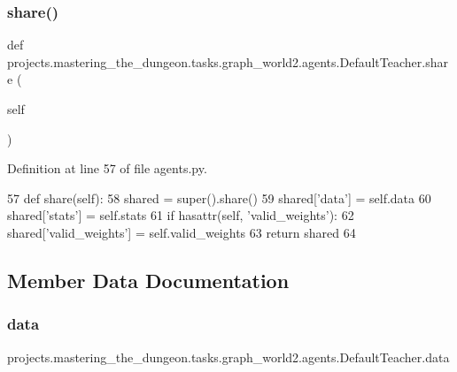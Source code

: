 \subsubsection{\texorpdfstring{share()}{share()}}
{\footnotesize\ttfamily def projects.\+mastering\+\_\+the\+\_\+dungeon.\+tasks.\+graph\+\_\+world2.\+agents.\+Default\+Teacher.\+share (\begin{DoxyParamCaption}\item[{}]{self }\end{DoxyParamCaption})}



Definition at line 57 of file agents.\+py.


\begin{DoxyCode}
57     \textcolor{keyword}{def }share(self):
58         shared = super().share()
59         shared[\textcolor{stringliteral}{'data'}] = self.data
60         shared[\textcolor{stringliteral}{'stats'}] = self.stats
61         \textcolor{keywordflow}{if} hasattr(self, \textcolor{stringliteral}{'valid\_weights'}):
62             shared[\textcolor{stringliteral}{'valid\_weights'}] = self.valid\_weights
63         \textcolor{keywordflow}{return} shared
64 
\end{DoxyCode}


\subsection{Member Data Documentation}
\mbox{\label{classprojects_1_1mastering__the__dungeon_1_1tasks_1_1graph__world2_1_1agents_1_1DefaultTeacher_ad9e0090c3398ba46ce2a0971419bd83d}} 
\subsubsection{\texorpdfstring{data}{data}}
{\footnotesize\ttfamily projects.\+mastering\+\_\+the\+\_\+dungeon.\+tasks.\+graph\+\_\+world2.\+agents.\+Default\+Teacher.\+data}



